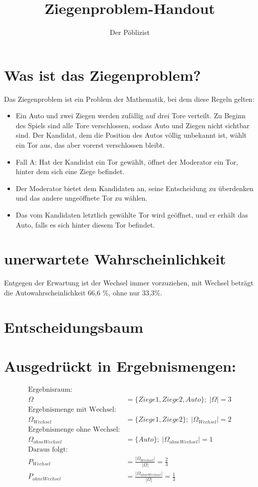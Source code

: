 \documentclass[a4paper]{article}
\title{Ziegenproblem-Handout}
\author{Der Pöblizist }
\begin{document}
\maketitle
\section{Was ist das Ziegenproblem?}
Das Ziegenproblem ist ein Problem der Mathematik, bei dem diese Regeln gelten:
\begin{itemize}
    \item Ein Auto und zwei Ziegen werden zufällig auf drei Tore verteilt.
    Zu Beginn des Spiels sind alle Tore verschlossen, sodass Auto und Ziegen nicht sichtbar sind.
    Der Kandidat, dem die Position des Autos völlig unbekannt ist, wählt ein Tor aus, das aber vorerst verschlossen bleibt.
    \item Fall A: Hat der Kandidat ein Tor gewählt, öffnet der Moderator ein Tor, hinter dem sich eine Ziege befindet.
    \item Der Moderator bietet dem Kandidaten an, seine Entscheidung zu überdenken und das andere ungeöffnete Tor zu wählen.
    \item Das vom Kandidaten letztlich gewählte Tor wird geöffnet, und er erhält das Auto, falls es sich hinter diesem Tor befindet.
\end{itemize}
\section{unerwartete Wahrscheinlichkeit}
Entgegen der Erwartung ist der Wechsel immer vorzuziehen, mit Wechsel beträgt die Autowahrscheinlichkeit 66,6 \%, ohne nur 33,3\%.
\section{Entscheidungsbaum}
\scalebox{0.75}{
}
\large
\section{Ausgedrückt in Ergebnismengen:}
		\begin{align*}
		\text{Ergebnisraum:}\\
		\Omega &= \{Ziege1, Ziege2, Auto\}; \; |\Omega|= 3\\
		\text{Ergebnismenge mit Wechsel:}\\
		\Omega_{Wechsel} &= \{Ziege1, Ziege2\};\; |\Omega_{Wechsel}|=2\\
		\text{Ergebnismenge ohne Wechsel:}\\
		\Omega_{ohne Wechsel} &= \{ Auto \};\;|\Omega_{ohne Wechsel}|= 1\\
		\text{Daraus folgt: }\\
		P_{Wechsel} &= \frac{ |\Omega_{Wechsel}|}{|\Omega|}= \frac{2}{3}\\
		P_{ohne Wechsel} &= \frac{|\Omega_{ohne Wechsel}|}{|\Omega|}= \frac{1}{3}
		\end{align*}
\end{document}
